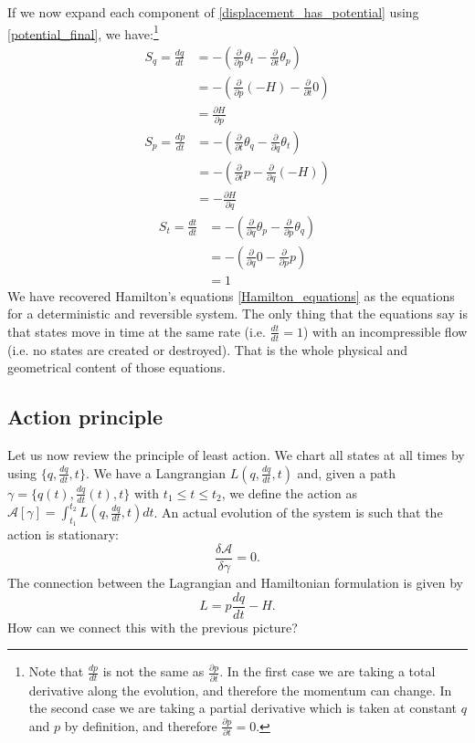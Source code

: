 \documentclass[10pt,twocolumn, nofootinbib]{revtex4-2}
\begin{document}
If we now expand each component of \ref{displacement_has_potential} using \ref{potential_final}, we have:\footnote{Note that $\frac{dp}{dt}$ is not the same as $\frac{\partial p}{\partial t}$. In the first case we are taking a total derivative along the evolution, and therefore the momentum can change. In the second case we are taking a partial derivative which is taken at constant $q$ and $p$ by definition, and therefore $\frac{\partial p}{\partial t}=0$.}
\begin{align*}
	S_q = \frac{dq}{dt}
	&= - \left( \frac{\partial}{\partial p} \theta_t - \frac{\partial}{\partial t} \theta_p \right) \\
	&= - \left( \frac{\partial}{\partial p} (-H) - \frac{\partial}{\partial t} 0 \right) \\
	& = \frac{\partial H}{\partial p}
\end{align*}
\begin{align*}
	S_p = \frac{dp}{dt}
	&= - \left( \frac{\partial}{\partial t} \theta_q - \frac{\partial}{\partial q} \theta_t \right) \\
	&= - \left( \frac{\partial}{\partial t} p - \frac{\partial}{\partial q} (-H) \right) \\
	& = - \frac{\partial H}{\partial q}
\end{align*}
\begin{align*}
	S_t = \frac{dt}{dt}
	&= - \left( \frac{\partial}{\partial q} \theta_p - \frac{\partial}{\partial p} \theta_q \right) \\
	&= - \left( \frac{\partial}{\partial q} 0 - \frac{\partial}{\partial p} p \right) \\
	& = 1
\end{align*}
We have recovered Hamilton's equations \ref{Hamilton_equations} as the equations for a deterministic and reversible system. The only thing that the equations say is that states move in time at the same rate (i.e. $\frac{dt}{dt} = 1$) with an incompressible flow (i.e. no states are created or destroyed). That is the whole physical and geometrical content of those equations.

\subsection{Action principle}

Let us now review the principle of least action. We chart all states at all times by using $\{q, \frac{dq}{dt}, t\}$. We have a Langrangian $L(q, \frac{dq}{dt}, t)$ and, given a path $\gamma = \{q(t), \frac{dq}{dt}(t), t\}$ with $t_1 \leq t \leq t_2$, we define the action as $\mathcal{A}[\gamma] = \int_{t_1}^{t_2} L(q, \frac{dq}{dt}, t) dt$. An actual evolution of the system is such that the action is stationary:
\begin{equation}
	\frac{\delta \mathcal{A}}{\delta \gamma} = 0.
\end{equation}
The connection between the Lagrangian and Hamiltonian formulation is given by
\begin{equation}
	L = p \frac{dq}{dt} - H.
\end{equation}
How can we connect this with the previous picture?
\end{document}
